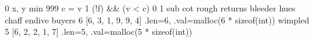 \expandafter\def\csname cpp:swap\endcsname{0}
\expandafter\def\csname cpp:PARAM(x,y)\endcsname{x, y}
\expandafter\def\csname cpp:comp\endcsname{min}
\expandafter\def\csname cpp:INIT\endcsname{999}
\expandafter\def\csname cpp:PROCESS(c,v)\endcsname{c = v}
\expandafter\def\csname cpp:NOT\endcsname{1}
\expandafter\def\csname cpp:COND(f,c,v)\endcsname{(!f) && (v < c)}
\expandafter\def\csname cpp:FALSE\endcsname{0}
\expandafter\def\csname cpp:TRUE\endcsname{1}
\expandafter\def\csname cpp:join\endcsname{sub}
\expandafter\def\csname cpp:FORALLIN\endcsname{cot}
\expandafter\def\csname cpp:A\endcsname{rough}
\expandafter\def\csname cpp:B\endcsname{returns}
\expandafter\def\csname cpp:C\endcsname{bleeder}
\expandafter\def\csname cpp:I\endcsname{hues}
\expandafter\def\csname cpp:J\endcsname{chaff}
\expandafter\def\csname cpp:F\endcsname{endive}
\expandafter\def\csname cpp:U\endcsname{buyers}
\expandafter\def\csname cpp:TABU_LEN\endcsname{6}
\expandafter\def\csname cpp:TABU_VAL\endcsname{[6, 3, 1, 9, 9, 4]}
\expandafter\def\csname cpp:TABU\endcsname{{.len=6, .val=malloc(6 * sizeof(int))}}
\expandafter\def\csname cpp:V\endcsname{wimpled}
\expandafter\def\csname cpp:TABV_LEN\endcsname{5}
\expandafter\def\csname cpp:TABV_VAL\endcsname{[6, 2, 2, 1, 7]}
\expandafter\def\csname cpp:TABV\endcsname{{.len=5, .val=malloc(5 * sizeof(int))}}

\def\C#1{\csname cpp:#1\endcsname}

